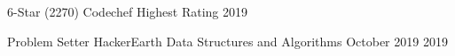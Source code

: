 \begin{cvhonors}
\cvhonor
{6-Star (2270)} %
{Codechef Highest Rating} %
{} %
{2019} %










\cvhonor
{Problem Setter} %
{HackerEarth Data Structures and Algorithms October 2019} %
{} %
{2019} %












\end{cvhonors}
